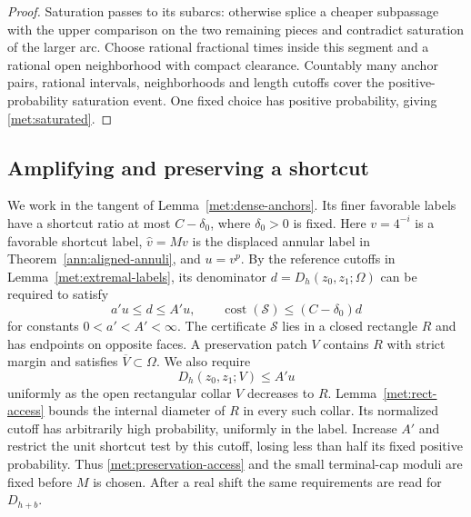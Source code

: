 \documentclass[11pt]{article}
\numberwithin{equation}{section}
\theoremstyle{definition}
\theoremstyle{remark}
\newcommand{\1}{\mathbf 1}
\begin{document}
\begin{proof}
Saturation passes to its subarcs: otherwise splice a cheaper
subpassage with the upper comparison on the two remaining pieces and
contradict saturation of the larger arc.  Choose rational fractional
times inside this segment and a rational open neighborhood with
compact clearance.  Countably many anchor pairs, rational intervals,
neighborhoods and length cutoffs cover the positive-probability
saturation event.  One fixed choice has positive probability, giving
\eqref{met:saturated}.
\end{proof}

\subsection{Amplifying and preserving a shortcut}

We work in the tangent of Lemma~\ref{met:dense-anchors}.  Its finer
favorable labels have a shortcut ratio at most $C-\delta_0$, where
$\delta_0>0$ is fixed.  Here $v=4^{-i}$ is a favorable shortcut label,
$\widehat v=Mv$ is the displaced annular label in
Theorem~\ref{ann:aligned-annuli}, and $u=v^p$.  By the
reference cutoffs in Lemma~\ref{met:extremal-labels}, its denominator
$d=D_{h}(z_0,z_1;\Omega)$ can be required to satisfy
\begin{equation}
 a'u\leq d\leq A'u,
 \qquad \operatorname{cost}(\mathcal S)\leq(C-\delta_0)d
 \label{met:shortcut}
\end{equation}
for constants $0<a'<A'<\infty$.  The certificate $\mathcal S$ lies in a
closed rectangle $R$ and has endpoints on opposite faces.  A
preservation patch $V$ contains $R$ with strict margin and satisfies
$\overline V\subset\Omega$.  We also require
\begin{equation}
 D_h(z_0,z_1;V)\leq A'u
 \label{met:preservation-access}
\end{equation}
uniformly as the open rectangular collar $V$ decreases to $R$.
Lemma~\ref{met:rect-access} bounds the internal diameter of $R$
in every such collar.  Its normalized cutoff has arbitrarily high
probability, uniformly in the label.  Increase $A'$ and restrict the
unit shortcut test by this cutoff, losing less than half its fixed
positive probability.  Thus \eqref{met:preservation-access} and the
small terminal-cap moduli are fixed before $M$ is chosen.  After a
real shift the same requirements are read for $D_{h+b}$.
\end{document}
